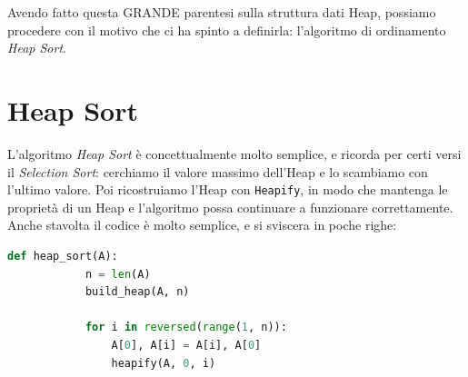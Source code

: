 \documentclass[12pt]{report}
\begin{document}
    Avendo fatto questa GRANDE parentesi sulla struttura dati Heap, possiamo procedere con il motivo che ci ha spinto a definirla: l'algoritmo di ordinamento \textit{Heap Sort}.
    	
    \section{Heap Sort}
    L'algoritmo \textit{Heap Sort} è concettualmente molto semplice, e ricorda per certi versi il \textit{Selection Sort}: cerchiamo il valore massimo dell'Heap e lo scambiamo con l'ultimo valore. Poi ricostruiamo l'Heap con \texttt{Heapify}, in modo che mantenga le proprietà di un Heap e l'algoritmo possa continuare a funzionare correttamente.	
    Anche stavolta il codice è molto semplice, e si sviscera in poche righe:
    	
    \begin{lstlisting}[language=Python, caption={Codice dell'algoritmo Heap Sort}]
    	def heap_sort(A):
    		n = len(A)
    		build_heap(A, n)
    		
    		for i in reversed(range(1, n)):
    			A[0], A[i] = A[i], A[0]
    			heapify(A, 0, i)
    		
    \end{lstlisting}
    	
\end{document}
